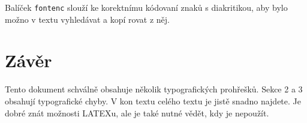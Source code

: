 \documentclass[twocolumn, 10pt, a4paper]{article}
\begin{document}
    Balíček \texttt{fontenc} slouží ke korektnímu kódovaní znaků
    s diakritikou, aby bylo možno v textu vyhledávat a kopí\-
    rovat z něj.
\section{Závěr}
Tento dokument schválně obsahuje několik typograﬁckých
prohřešků. Sekce 2 a 3 obsahují typograﬁcké chyby. V kon\-
textu celého textu je jistě snadno najdete. Je dobré znát
možnosti LATEXu, ale je také nutné vědět, kdy je nepoužít.
{}
\end{document}

